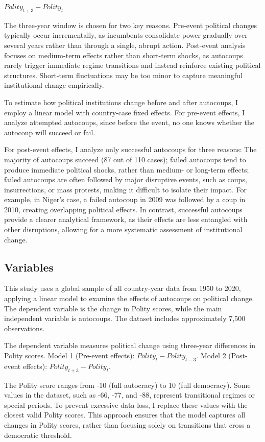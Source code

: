 \documentclass[
  12pt,
]{report}
\begin{document}
\(Polity_{t+3} - Polity_t\)

The three-year window is chosen for two key reasons. Pre-event political
changes typically occur incrementally, as incumbents consolidate power
gradually over several years rather than through a single, abrupt
action. Post-event analysis focuses on medium-term effects rather than
short-term shocks, as autocoups rarely trigger immediate regime
transitions and instead reinforce existing political structures.
Short-term fluctuations may be too minor to capture meaningful
institutional change empirically.

To estimate how political institutions change before and after
autocoups, I employ a linear model with country-case fixed effects. For
pre-event effects, I analyze attempted autocoups, since before the
event, no one knows whether the autocoup will succeed or fail.

For post-event effects, I analyze only successful autocoups for three
reasons: The majority of autocoups succeed (87 out of 110 cases); failed
autocoups tend to produce immediate political shocks, rather than
medium- or long-term effects; failed autocoups are often followed by
major disruptive events, such as coups, insurrections, or mass protests,
making it difficult to isolate their impact. For example, in Niger's
case, a failed autocoup in 2009 was followed by a coup in 2010, creating
overlapping political effects. In contrast, successful autocoups provide
a clearer analytical framework, as their effects are less entangled with
other disruptions, allowing for a more systematic assessment of
institutional change.

\subsection{Variables}\label{variables-1}

This study uses a global sample of all country-year data from 1950 to
2020, applying a linear model to examine the effects of autocoups on
political change. The dependent variable is the change in Polity scores,
while the main independent variable is autocoups. The dataset includes
approximately 7,500 observations.

The dependent variable measures political change using three-year
differences in Polity scores. Model 1 (Pre-event effects):
\(Polity_t − Polity_{t − 3}\). Model 2 (Post-event effects):
\(Polity_{t+3} - Polity_t\).

The Polity score ranges from -10 (full autocracy) to 10 (full
democracy). Some values in the dataset, such as -66, -77, and -88,
represent transitional regimes or special periods. To prevent excessive
data loss, I replace these values with the closest valid Polity scores.
This approach ensures that the model captures all changes in Polity
scores, rather than focusing solely on transitions that cross a
democratic threshold.
\end{document}
